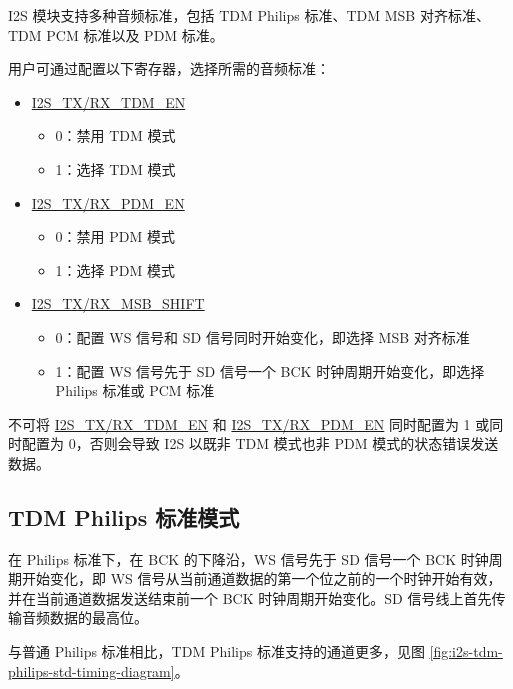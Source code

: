 \documentclass[main\_\_CN.tex]{subfiles}
\begin{document}
\chipname{} I2S 模块支持多种音频标准，包括 TDM Philips 标准、TDM MSB 对齐标准、TDM PCM 标准以及 PDM 标准。

用户可通过配置以下寄存器，选择所需的音频标准：

\begin{itemize}
    \item \hyperref[fielddesc:I2SRXMSBSHIFT]{I2S\_TX/RX\_TDM\_EN}
    \begin{itemize}
        \item 0：禁用 TDM 模式
        \item 1：选择 TDM 模式
    \end{itemize}
    \item \hyperref[fielddesc:I2SRXMSBSHIFT]{I2S\_TX/RX\_PDM\_EN}
    \begin{itemize}
        \item 0：禁用 PDM 模式
        \item 1：选择 PDM 模式
    \end{itemize}    
    \item \hyperref[fielddesc:I2SRXMSBSHIFT]{I2S\_TX/RX\_MSB\_SHIFT}
    \begin{itemize}
        \item 0：配置 WS 信号和 SD 信号同时开始变化，即选择 MSB 对齐标准
        \item 1：配置 WS 信号先于 SD 信号一个 BCK 时钟周期开始变化，即选择 Philips 标准或 PCM 标准
    \end{itemize}
\end{itemize}

\begin{tiplisting}
不可将 \hyperref[fielddesc:I2SRXMSBSHIFT]{I2S\_TX/RX\_TDM\_EN} 和 \hyperref[fielddesc:I2SRXMSBSHIFT]{I2S\_TX/RX\_PDM\_EN} 同时配置为 1 或同时配置为 0，否则会导致 \chipname{} I2S 以既非 TDM 模式也非 PDM 模式的状态错误发送数据。
\end{tiplisting}

\subsection{TDM Philips 标准模式}

在 Philips 标准下，在 BCK 的下降沿，WS 信号先于 SD 信号一个 BCK 时钟周期开始变化，即 WS 信号从当前通道数据的第一个位之前的一个时钟开始有效，并在当前通道数据发送结束前一个 BCK 时钟周期开始变化。SD 信号线上首先传输音频数据的最高位。

与普通 Philips 标准相比，TDM Philips 标准支持的通道更多，见图 \ref{fig:i2s-tdm-philips-std-timing-diagram}。
\end{document}
